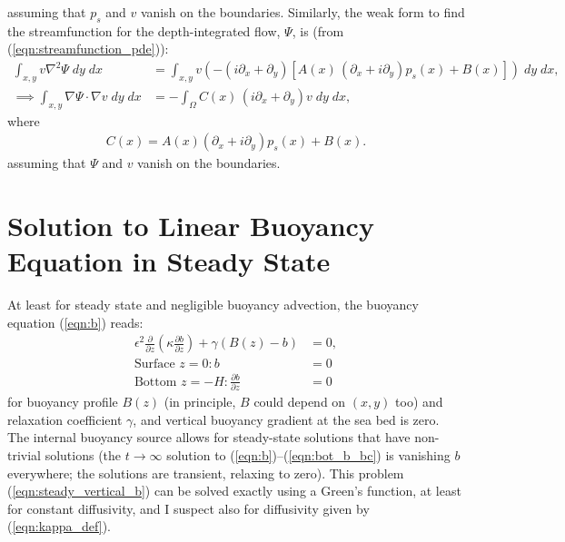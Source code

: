 \documentclass[10pt]{amsart}
\begin{document}
assuming that $p_s$ and $v$ vanish on the boundaries.
Similarly, the weak form to find the streamfunction for the depth-integrated flow, $\Psi$, is (from (\ref{eqn:streamfunction_pde})):
 \begin{align}
 \int_{x,y} v
\nabla^2 \Psi \; dy\; dx 
 & = \int_{x,y} v \left(
- \left( i \partial_x + \partial_y \right) \left[ A(x)\,\left( \partial_x + i \partial_y \right) p_s(x)  + B(x) \right] 
\right) \; dy\; dx , \nonumber \\
 \implies 
 \int_{x,y} \nabla \Psi \cdot \nabla v \; dy \; dx
 & = - \int_\Omega C(x) \, (i\partial_x + \partial_y)v \; d y \; dx , \nonumber
\end{align}
where
\begin{align}
C(x) = A(x) (\partial_x + i\partial_y)p_s(x) + B(x) . \nonumber
\end{align}
assuming that $\Psi$ and $v$ vanish on the boundaries.


\section{Solution to Linear Buoyancy Equation in Steady State}
\label{sec:b_solution}

At least for steady state and negligible buoyancy advection, the buoyancy equation (\ref{eqn:b}) reads:
\begin{align}
\epsilon^2 \frac{\partial }{\partial z} \left( \kappa \frac{\partial b}{\partial z} \right) + \gamma \left(  B(z) - b \right) & = 0, \label{eqn:steady_vertical_b} \\
\text{Surface~}z = 0:
b &= 0
 \\
\text{Bottom~}z = -H:
\frac{\partial b}{\partial z} &= 0
\end{align}
for buoyancy profile $B(z)$ (in principle, $B$ could depend on $(x,y)$ too) and relaxation coefficient $\gamma$, and vertical buoyancy gradient at the sea bed is zero. 
The internal buoyancy source allows for steady-state solutions that have non-trivial solutions (the $t\rightarrow \infty$ solution to (\ref{eqn:b})--(\ref{eqn:bot_b_bc}) is vanishing $b$ everywhere; the \citealt{peterson&callies26} solutions are transient, relaxing to zero).
This problem (\ref{eqn:steady_vertical_b}) can be solved exactly using a Green's function, at least for constant diffusivity, and I suspect also for diffusivity given by (\ref{eqn:kappa_def}). 
\end{document}
